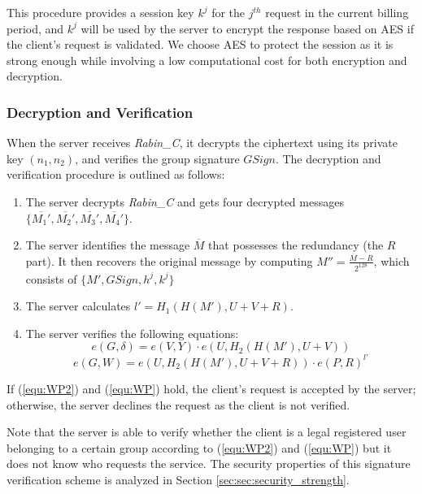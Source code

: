 \documentclass[letterpaper,12pt]{article}
\begin{document}
 This procedure provides a session key $k^j$ for the $j^{th}$ request in the current billing period, and $k^j$ will be used by the server to encrypt the response based on AES if the client's request is validated. We choose AES to protect the session as it is strong enough while involving a low computational cost for both encryption and decryption.

\subsubsection {Decryption and Verification}\label{sec:sec:decryption}

When the server receives \emph{Rabin\_C}, it decrypts the ciphertext using its private key $(n_1, n_2)$, and verifies the group signature $GSign$. The decryption and verification procedure is outlined as follows:
\begin{enumerate}
\item  The server decrypts \emph{Rabin\_C} and gets four decrypted messages $\{ \overline{M_1'}, \overline{M_2'}, \overline{M_3'}, \overline{M_4'}\}$.

\item  The server identifies the message $\overline{M}$ that possesses the redundancy (the $R$ part). It then recovers the original message by computing $M''=\frac{\overline{M}-R}{2^{128}}$, which consists of  $\{M', GSign, h^{j}, k^j \}$
\item The server calculates $l'=H_1(H(M'), U+V+R)$.
\item  The server verifies the following equations:
\begin{equation}
 e(G, \delta )=e(V, Y)\cdot e(U, H_2(H(M'),U+V)) \label{equ:WP2}
\end{equation}
\begin{equation}
 e(G, W)=e(U, H_2(H(M'), U+V+R))\cdot e(P, R)^{l'} \label{equ:WP}
\end{equation}
\end{enumerate}

If  (\ref{equ:WP2}) and (\ref{equ:WP}) hold, the client's request is accepted by the server; otherwise, the server declines the request as the client is not verified.

Note that the server is able to verify  whether the client is a legal registered user belonging to a certain group according to (\ref{equ:WP2}) and (\ref{equ:WP}) but it does not know who requests the service.  The security properties of this signature verification scheme is analyzed in Section \ref{sec:sec:security_strength}.
\end{document}
